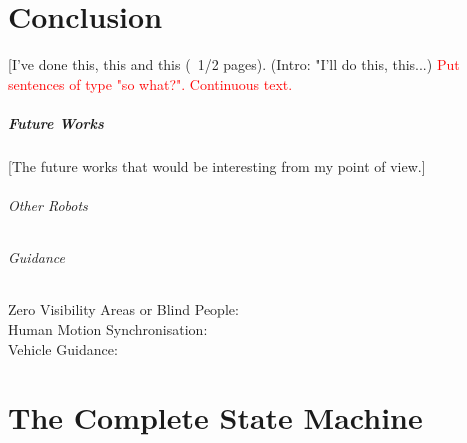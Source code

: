 \documentclass[oneside, a4paper, 12pt]{memoir}
\begin{document}
\chapter{Conclusion}

[I've done this, this and this (~1/2 pages). (Intro: "I'll do this, this...) \textcolor{red}{Put sentences of type "so what?". Continuous text.}

	\paragraph{Future Works}
	[The future works that would be interesting from my point of view.]
	
		\subparagraph{Other Robots}
		\subparagraph{Guidance}
			
			\begin{description}
				\item[Zero Visibility Areas or Blind People:]
				\item[Human Motion Synchronisation:]
				\item[Vehicle Guidance:]
			\end{description}
			


\appendix

\chapter{The Complete State Machine}
\label{app:complete_state_machine}
\end{document}
